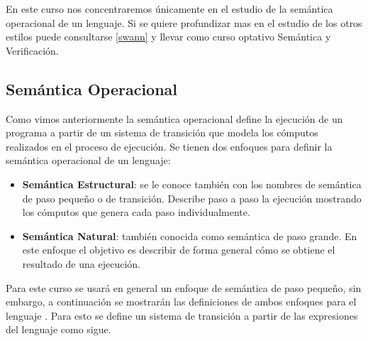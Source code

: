 \documentclass[12pt]{extarticle}
\begin{document}
En este curso nos concentraremos únicamente en el estudio de la semántica operacional de un lenguaje. Si se quiere profundizar mas en el estudio de los otros estilos puede consultarse 
\ref{swann}
 y llevar como curso optativo Semántica y Verificación.
\subsection{Semántica Operacional}
Como vimos anteriormente la semántica operacional define la ejecución de un programa a partir de un sistema de transición que modela los cómputos realizados en el proceso de ejecución. Se tienen dos enfoques para definir la semántica operacional de un lenguaje:
\begin{itemize}
    \item {\bf Semántica Estructural}: se le conoce también con los nombres de semántica de paso pequeño o de transición. Describe paso a paso la ejecución mostrando los cómputos que genera cada paso individualmente.
    \item {\bf Semántica Natural}: también conocida como semántica de paso grande. En este enfoque el objetivo es describir de forma general cómo se obtiene el resultado de una ejecución.
\end{itemize}
Para este curso se usará en general un enfoque de semántica de paso pequeño, sin embargo, a continuación se mostrarán las definiciones de ambos enfoques para el lenguaje \ea. Para esto se define un sistema de transición a partir de las expresiones del lenguaje como sigue.
\end{document}
